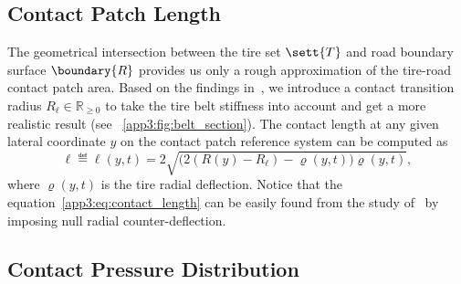 \subsection{Contact Patch Length}
\label{app3:sec:contact_patch}

The geometrical intersection between the tire set $\sett{T}$ and road boundary surface $\boundary{R}$ provides us only a rough approximation of the tire-road contact patch area. Based on the findings in~\cite{koutny2007geometry, rhyne2005development}, we introduce a contact transition radius $R_\ell \in \mathbb{R}_{\geq 0}$ to take the tire belt stiffness into account and get a more realistic result (see \figurename~\ref{app3:fig:belt_section}). The contact length at any given lateral coordinate $y$ on the contact patch reference system can be computed as
%
\begin{equation}
  \ell \eqdef \ell(y,t) = 2\sqrt{\big(2(R(y)-R_\ell) - \varrho(y,t)\big)\varrho(y,t)},
  \label{app3:eq:contact_length}
\end{equation}
%
where $\varrho(y,t)$ is the tire radial deflection. Notice that the equation~\eqref{app3:eq:contact_length} can be easily found from the study of~\citet{rhyne2005development} by imposing null radial counter-deflection.

\subsection{Contact Pressure Distribution}
\label{app3:sec:pressure_distribution}

